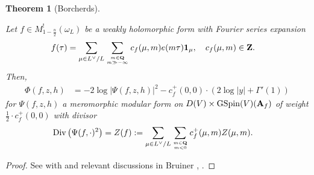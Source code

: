 \documentclass{amsart}
\newtheorem{theorem}{Theorem}[section]
\theoremstyle{definition}
\theoremstyle{definition}
\theoremstyle{definition}
\begin{document}
\begin{theorem}[Borcherds]\label{Borcherds}

Let $f \in M_{1 - \frac{n}{2}}^!(\omega_L)$ be a weakly holomorphic form with Fourier series expansion
\begin{align*} f(\tau) &= \sum\limits_{\mu \in L^{\vee}/L} 
\sum\limits_{m \in {\bf{Q}} \atop m \gg - \infty} c_f(\mu, m) e(m \tau) {\bf{1}}_{\mu}, \quad c_f(\mu, m) \in {\bf{Z}}.\end{align*}
Then,
\begin{align}\label{BF} \Phi(f, z, h) &= - 2 \log \vert \Psi(f, z, h) \vert^2 - c_f^+(0, 0) \cdot \left( 2 \log \vert y \vert + \Gamma'(1) \right) \end{align}
for $\Psi(f, z, h)$ a meromorphic modular form on $D(V) \times \operatorname{GSpin}(V)({\bf{A}}_f)$ of weight $\frac{1}{2} \cdot c_f^+(0,0)$ with divisor 
\begin{align*} \operatorname{Div} \left( \Psi(f, \cdot)^2 \right) 
&= Z(f) := \sum\limits_{\mu \in L^{\vee}/L} \sum\limits_{m \in {\bf{Q}} \atop m < 0} c_f^+(\mu, m) Z(\mu,m). \end{align*}

\end{theorem}

\begin{proof} See \cite[Theorem 13.3]{Bo} with \cite[Theorems 1.2 and 1.3]{KuBF} and relevant discussions in Bruiner \cite{Br}, \cite{Br-123}. \end{proof}
\end{document}
